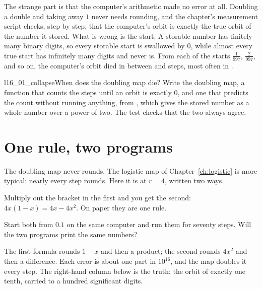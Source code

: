 The strange part is that the computer's arithmetic made no error at all.
Doubling a double and taking away $1$ never needs rounding, and the chapter's
measurement script checks, step by step, that the computer's orbit is exactly
the true orbit of the number it stored. What is wrong is the start. A storable
number has finitely many binary digits, so every storable start is swallowed
by $0$, while almost every true start has infinitely many digits and never
is. From each of the  starts $\tfrac{1}{997}$,
$\tfrac{2}{997}$, and so on, the computer's orbit died in between
 and  steps, most often in
.


\begin{lab}{l16_01_collapse}{When does the doubling map die?}
Write the doubling map, a function that counts the steps until an orbit is
exactly $0$, and one that predicts the count without running anything, from
, which gives the stored number as a whole
number over a power of two. The test checks that the two always agree.
\end{lab}

\section{One rule, two programs}
\label{sec:ch16-formulas}

\noindent
The doubling map never rounds. The logistic map of
Chapter~\ref{ch:logistic} is more typical: nearly every step rounds. Here it
is at $r = 4$, written two ways.


\noindent
Multiply out the bracket in the first and you get the second:
$4x(1 - x) = 4x - 4x^{2}$. On paper they are one rule.

\begin{think}
Start both from $\num{0.1}$ on the same computer and run them for seventy
steps. Will the two programs print the same numbers?
\end{think}
The first formula rounds $1 - x$ and then a product; the second rounds
$4x^{2}$ and then a difference. Each error is about one part in $10^{16}$,
and the map doubles it every step. The right-hand column below is the truth:
the orbit of exactly one tenth, carried to a hundred significant digits.


